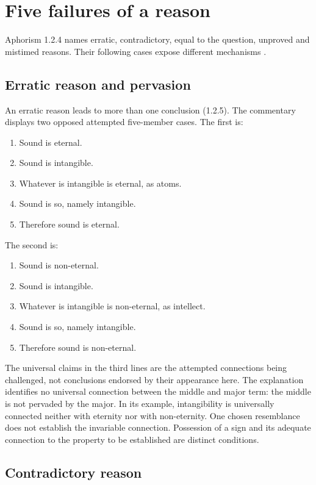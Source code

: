 \section{Five failures of a reason}
\label{sec:p13-nyaya-fallacious-reasons}

Aphorism 1.2.4 names erratic, contradictory, equal to the question, unproved
and mistimed reasons. Their following cases expose different mechanisms
\cite[1.2.4--9, pp.~15--17]{GotamaVidyabhusana1913NyayaSutras}.

\subsection{Erratic reason and pervasion}

An erratic reason leads to more than one conclusion (1.2.5).
The commentary displays two opposed attempted five-member cases.
The first is:
\begin{enumerate}
 \item Sound is eternal.
 \item Sound is intangible.
 \item Whatever is intangible is eternal, as atoms.
 \item Sound is so, namely intangible.
 \item Therefore sound is eternal.
\end{enumerate}
The second is:
\begin{enumerate}
 \item Sound is non-eternal.
 \item Sound is intangible.
 \item Whatever is intangible is non-eternal, as intellect.
 \item Sound is so, namely intangible.
 \item Therefore sound is non-eternal.
\end{enumerate}
The universal claims in the third lines are the attempted connections
being challenged, not conclusions endorsed by their appearance here.
The explanation identifies no universal connection between the middle and
major term: the middle is not pervaded by the major. In its example,
intangibility is universally connected neither with eternity nor with
non-eternity. One chosen resemblance does not establish the invariable
connection. Possession of a sign and its adequate connection to the
property to be established are distinct conditions.

\subsection{Contradictory reason}

